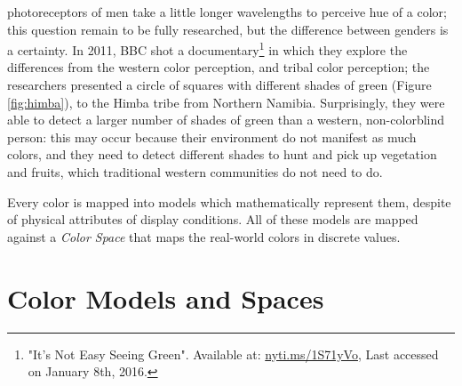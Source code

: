\documentclass{report}
\begin{document}
photoreceptors of men take a little longer wavelengths to perceive hue of a color; this question remain
to be fully researched, but the difference between genders is a certainty. In 2011, BBC shot a
documentary\footnote{\label{itsnoteasy}"It's Not Easy Seeing Green". Available at: 
{\url {nyti.ms/1S71yVo}}, 
Last accessed on January 8th, 2016.} in which they explore the differences from the western color
perception, and tribal color perception; the researchers presented a circle of squares with different
shades of green (Figure \ref{fig:himba}), to the Himba tribe from Northern Namibia. Surprisingly, they were able to detect a larger
number of shades of green than a western, non-colorblind person: this may occur because their environment do not
manifest as much colors, and they need to detect different shades to hunt and pick up vegetation and
fruits, which traditional western communities do not need to do. \\
\par
Every color is mapped into models which mathematically represent them, despite of physical attributes of display conditions.
All of these models are mapped against a \emph{Color Space} that maps the real-world colors in discrete values.  
%
\section{Color Models and Spaces}
\end{document}
